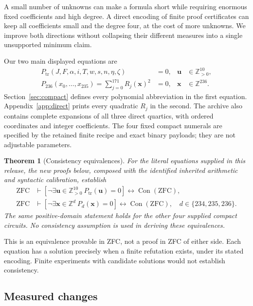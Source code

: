 \documentclass[11pt]{article}
\newtheorem{theorem}{Theorem}[section]
\theoremstyle{definition}
\newcommand{\Z}{\mathbb Z}\newcommand{\N}{\mathbb N}\newcommand{\Q}{\mathbb Q}
\newcommand{\Con}{\operatorname{Con}}\newcommand{\lcm}{\operatorname{lcm}}
\begin{document}
A small number of unknowns can make a formula short while requiring
enormous fixed coefficients and high degree. A direct encoding of finite
proof certificates can keep all coefficients small and the degree four,
at the cost of more unknowns. We improve both directions without collapsing
their different measures into a single unsupported minimum claim.

Our two main displayed equations are
\begin{align}
 P_{\mathrm{tr}}(J,F,\alpha,i,T,w,s,n,\eta,\zeta)&=0,
 &\boldsymbol u&\in\Z_{>0}^{10},\label{eq:compact-statement}\\
 P_{236}(x_0,\ldots,x_{235})
  =\sum_{j=0}^{171}R_j(\boldsymbol x)^2&=0,
 &\boldsymbol x&\in\Z^{236}.\label{eq:direct-statement}
\end{align}
Section~\ref{sec:compact} defines every polynomial abbreviation in the first
equation. Appendix~\ref{app:direct} prints every quadratic $R_j$ in the
second. The archive also contains complete expansions of all three direct
quartics, with ordered coordinates and integer coefficients. The four fixed
compact numerals are specified by the retained finite recipe and exact
binary payloads; they are not adjustable parameters.

\begin{theorem}[Consistency equivalences]\label{thm:calibration}
For the literal equations supplied in this release, the new proofs below,
composed with the identified inherited arithmetic and syntactic calibration,
establish
\begin{align*}
 \mathrm{ZFC}&\vdash
 [\neg\exists\boldsymbol u\in\Z_{>0}^{10}\ P_{\mathrm{tr}}(\boldsymbol u)=0]
 \longleftrightarrow\Con(\mathrm{ZFC}),\\
 \mathrm{ZFC}&\vdash
 [\neg\exists\boldsymbol x\in\Z^{d}\ P_d(\boldsymbol x)=0]
 \longleftrightarrow\Con(\mathrm{ZFC}),\quad d\in\{234,235,236\}.
\end{align*}
The same positive-domain statement holds for the other four supplied
compact circuits. No consistency assumption is used in deriving these
equivalences.
\end{theorem}

This is an equivalence provable in ZFC, not a proof in ZFC of either side.
Each equation has a solution precisely when a finite refutation exists,
under its stated encoding. Finite experiments with candidate solutions
would not establish consistency.

\subsection{Measured changes}

\end{document}
